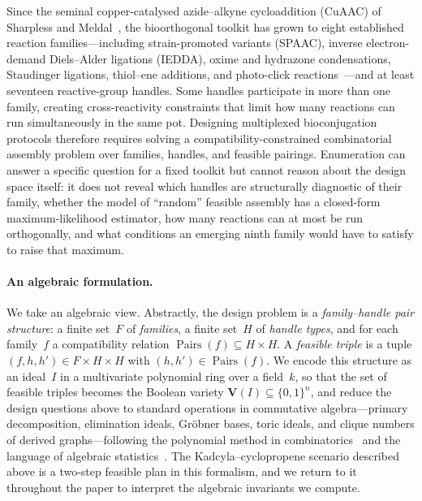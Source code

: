 \documentclass[preprint,12pt]{elsarticle}
\theoremstyle{definition}
\theoremstyle{remark}
\newcommand{\kk}{k}
\newcommand{\Var}{\mathbf{V}}
\DeclareMathOperator{\Pairs}{Pairs}
\begin{document}
Since the seminal copper-catalysed azide--alkyne cycloaddition
(CuAAC) of Sharpless and Meldal~\cite{Rostovtsev02,Tornoe02}, the
bioorthogonal toolkit has grown to eight established reaction
families---including strain-promoted variants (SPAAC), inverse
electron-demand Diels--Alder ligations (IEDDA), oxime and
hydrazone condensations, Staudinger ligations, thiol--ene
additions, and photo-click reactions~\cite{Lang14,McKay14}---and
at least seventeen reactive-group handles.  Some handles
participate in more than one family, creating cross-reactivity
constraints that limit how many reactions can run simultaneously
in the same pot.  Designing multiplexed bioconjugation protocols
therefore requires solving a compatibility-constrained
combinatorial assembly problem over families, handles, and
feasible pairings.  Enumeration can answer a specific question for
a fixed toolkit but cannot reason about the design space itself:
it does not reveal which handles are structurally diagnostic of
their family, whether the model of ``random'' feasible assembly
has a closed-form maximum-likelihood estimator, how many reactions
can at most be run orthogonally, and what conditions an emerging
ninth family would have to satisfy to raise that maximum.

\paragraph{An algebraic formulation.}
We take an algebraic view.  Abstractly, the design problem is a
\emph{family--handle pair structure}: a finite set~$F$ of
\emph{families}, a finite set~$H$ of \emph{handle types}, and for
each family~$f$ a compatibility relation
$\Pairs(f) \subseteq H \times H$.  A \emph{feasible triple}
is a tuple $(f, h, h') \in F \times H \times H$ with
$(h, h') \in \Pairs(f)$.
We encode this structure as an ideal~$I$ in a multivariate
polynomial ring over a field~$\kk$, so that the set of feasible
triples becomes the Boolean variety $\Var(I) \subseteq \{0,1\}^n$,
and reduce the design questions above to standard operations in
commutative algebra---primary decomposition, elimination ideals,
Gr\"obner bases, toric ideals, and clique numbers of derived
graphs---following the polynomial method in
combinatorics~\cite{CLO15} and the language of algebraic
statistics~\cite{PS05,DSS09}.  The Kadcyla--cyclopropene scenario
described above is a two-step feasible plan in this formalism,
and we return to it throughout the paper to interpret the
algebraic invariants we compute.
\end{document}
